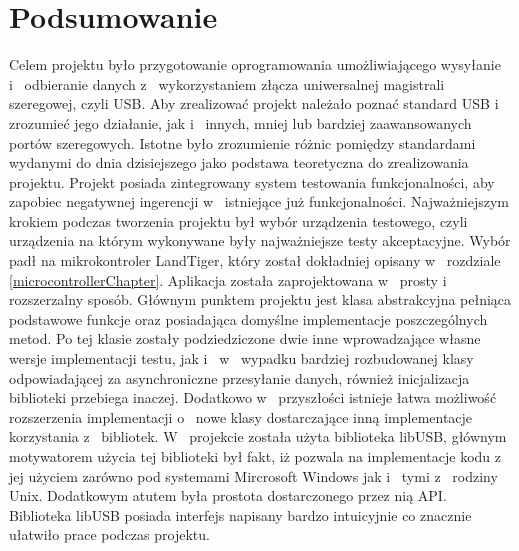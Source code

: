 \documentclass{BscUS}
\begin{document}
\chapter{Podsumowanie}
\label{ConclusionChapter}
\indent Celem projektu było przygotowanie oprogramowania umożliwiającego wysyłanie i~ odbieranie danych z~ wykorzystaniem złącza uniwersalnej magistrali szeregowej, czyli USB. Aby zrealizować projekt należało poznać standard USB i~ zrozumieć jego działanie, jak i~ innych, mniej lub bardziej zaawansowanych portów szeregowych. Istotne było zrozumienie różnic pomiędzy standardami wydanymi do dnia dzisiejszego jako podstawa teoretyczna do zrealizowania projektu. Projekt posiada zintegrowany system testowania funkcjonalności, aby zapobiec negatywnej ingerencji w~ istniejące już funkcjonalności.
\newline
\indent Najważniejszym krokiem podczas tworzenia projektu był wybór urządzenia testowego, czyli urządzenia na którym wykonywane były najważniejsze testy akceptacyjne. Wybór padł na mikrokontroler LandTiger, który został dokładniej opisany w~ rozdziale \ref{microcontrollerChapter}. Aplikacja została zaprojektowana w~ prosty i~ rozszerzalny sposób. Głównym punktem projektu jest klasa abstrakcyjna pełniąca podstawowe funkcje oraz posiadająca domyślne implementacje poszczególnych metod. Po tej klasie zostały podziedziczone dwie inne wprowadzające własne wersje implementacji testu, jak i~ w~ wypadku bardziej rozbudowanej klasy odpowiadającej za asynchroniczne przesyłanie danych, również inicjalizacja biblioteki przebiega inaczej. Dodatkowo w~ przyszłości istnieje łatwa możliwość rozszerzenia implementacji o~ nowe klasy dostarczające inną implementacje korzystania z~ bibliotek.
\newline
\indent W~ projekcie została użyta biblioteka libUSB, głównym motywatorem użycia tej biblioteki był fakt, iż pozwala na implementacje kodu z~ jej użyciem zarówno pod systemami Mircrosoft Windows jak i~ tymi z~ rodziny Unix. Dodatkowym atutem była prostota dostarczonego przez nią API. Biblioteka libUSB posiada interfejs napisany bardzo intuicyjnie co znacznie ułatwiło prace podczas projektu.
\newline
\end{document}

